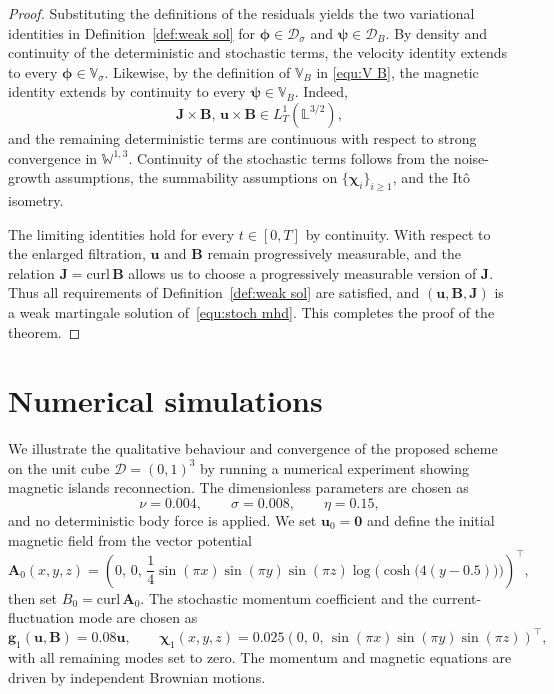 \documentclass[11pt, reqno]{amsart}
\theoremstyle{definition}
\numberwithin{equation}{section}
\newcommand{\curl}{\mathrm{curl}\,}
\newcommand{\bff}{\boldsymbol}
\newcommand{\bb}{\mathbb}
\begin{document}
\begin{proof}
	Substituting the definitions of the residuals yields the two variational
	identities in Definition~\ref{def:weak sol} for $\bff\phi\in
	\mathcal D_\sigma$ and $\bff\psi \in\mathcal D_B$. By density and continuity of the deterministic and stochastic terms,
	the velocity identity extends to every $\bff\phi\in\bb V_\sigma$.
	Likewise, by the definition of $\bb{V}_B$ in \eqref{equ:V B}, the magnetic identity extends by continuity to every $\bff\psi\in\bb V_B$. Indeed,
	\[
	\bff J\times\bff B,\,
	\bff u\times\bff B
	\in L^1_T(\bb L^{3/2}),
	\]
	and the remaining deterministic terms are continuous with respect to
	strong convergence in $\bb W^{1,3}$. Continuity of the stochastic terms
	follows from the noise-growth assumptions, the summability assumptions on
	$\{\bff\chi_i\}_{i\ge1}$, and the It\^o isometry.
	
	The limiting identities hold for every $t\in[0,T]$ by continuity.
	With respect to the enlarged filtration, $\bff u$ and $\bff B$ remain progressively measurable, and the relation $\bff J=\curl\bff B$ allows
	us to choose a progressively measurable version of $\bff J$.
	Thus all requirements of Definition~\ref{def:weak sol} are satisfied, and $(\bff u,\bff B,\bff J)$ is a weak martingale solution of~\eqref{equ:stoch mhd}. This completes the proof of the theorem.
\end{proof}


\section{Numerical simulations}
\label{sec:numerical experiments}

We illustrate the qualitative behaviour and convergence of the proposed scheme on the unit cube $\mathscr D=(0,1)^3$ by running a numerical experiment showing magnetic islands reconnection.
The dimensionless parameters are chosen as
\[
	\nu=0.004,
	\qquad
	\sigma=0.008,
	\qquad
	\eta=0.15,
\]
and no deterministic body force is applied. We set $\bff u_0 = \bff0$ and
define the initial magnetic field from the vector potential
\[
\bff A_0(x,y,z)
=
\left(0,\, 0,\,
\frac14 \sin(\pi x)\sin(\pi y)\sin(\pi z)
\log \bigl(\cosh \bigl(4 (y- 0.5) \bigr)\bigr) \right)^\top,
\]
then set $B_0=\curl\bff A_0$.
The stochastic momentum coefficient and the current-fluctuation mode are chosen as
\[
\bff g_1(\bff u,\bff B)=0.08\bff u,
\qquad
\bff\chi_1(x,y,z)
=
0.025
\left(
0,\,
0,\,
\sin(\pi x)\sin(\pi y)\sin(\pi z)
\right)^\top,
\]
with all remaining modes set to zero. The momentum and magnetic equations are driven by independent Brownian motions.
\end{document}
